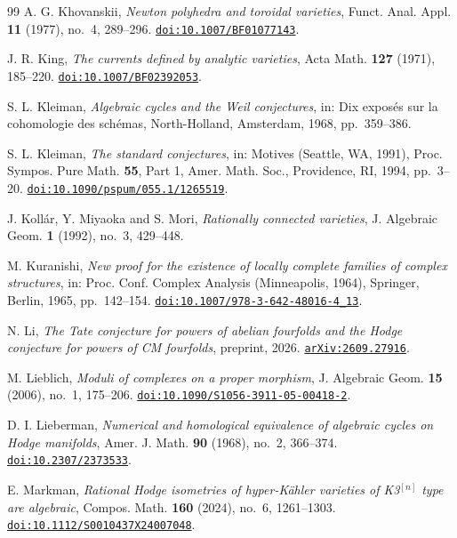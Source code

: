 \begin{thebibliography}{99}
A. G. Khovanskii,
\emph{Newton polyhedra and toroidal varieties},
Funct. Anal. Appl. \textbf{11} (1977), no.~4, 289--296.
\href{https://doi.org/10.1007/BF01077143}{\texttt{doi:10.1007/BF01077143}}.

J. R. King,
\emph{The currents defined by analytic varieties},
Acta Math. \textbf{127} (1971), 185--220.
\href{https://doi.org/10.1007/BF02392053}{\texttt{doi:10.1007/BF02392053}}.

S. L. Kleiman,
\emph{Algebraic cycles and the Weil conjectures},
in: Dix expos\'es sur la cohomologie des sch\'emas,
North-Holland, Amsterdam, 1968, pp.~359--386.

S. L. Kleiman,
\emph{The standard conjectures},
in: Motives (Seattle, WA, 1991),
Proc. Sympos. Pure Math. \textbf{55}, Part 1,
Amer. Math. Soc., Providence, RI, 1994, pp.~3--20.
\href{https://doi.org/10.1090/pspum/055.1/1265519}{\texttt{doi:10.1090/pspum/055.1/1265519}}.

J. Koll\'ar, Y. Miyaoka and S. Mori,
\emph{Rationally connected varieties},
J. Algebraic Geom. \textbf{1} (1992), no.~3, 429--448.

M. Kuranishi,
\emph{New proof for the existence of locally complete families of complex
structures},
in: Proc. Conf. Complex Analysis (Minneapolis, 1964),
Springer, Berlin, 1965, pp.~142--154.
\href{https://doi.org/10.1007/978-3-642-48016-4_13}{\texttt{doi:10.1007/978-3-642-48016-4\_13}}.

N. Li,
\emph{The Tate conjecture for powers of abelian fourfolds and the Hodge
conjecture for powers of CM fourfolds},
preprint, 2026.
\href{https://arxiv.org/abs/2609.27916}{\texttt{arXiv:2609.27916}}.

M. Lieblich,
\emph{Moduli of complexes on a proper morphism},
J. Algebraic Geom. \textbf{15} (2006), no.~1, 175--206.
\href{https://doi.org/10.1090/S1056-3911-05-00418-2}%
{\texttt{doi:10.1090/S1056-3911-05-00418-2}}.

D. I. Lieberman,
\emph{Numerical and homological equivalence of algebraic cycles on Hodge
manifolds},
Amer. J. Math. \textbf{90} (1968), no.~2, 366--374.
\href{https://doi.org/10.2307/2373533}{\texttt{doi:10.2307/2373533}}.

E. Markman,
\emph{Rational Hodge isometries of hyper-K\"ahler varieties of K3$^{[n]}$
type are algebraic},
Compos. Math. \textbf{160} (2024), no.~6, 1261--1303.
\href{https://doi.org/10.1112/S0010437X24007048}{\texttt{doi:10.1112/S0010437X24007048}}.


\end{thebibliography}
